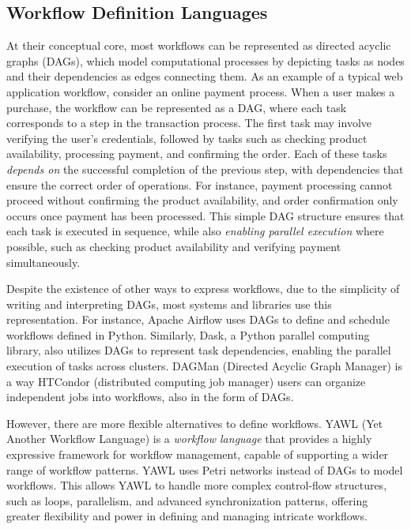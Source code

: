 \subsection{Workflow Definition Languages}
At their conceptual core, most workflows can be represented as directed acyclic graphs (DAGs), which model computational processes by depicting tasks as nodes and their dependencies as edges connecting them. As an example of a typical web application workflow, consider an online payment process. When a user makes a purchase, the workflow can be represented as a DAG, where each task corresponds to a step in the transaction process. The first task may involve verifying the user's credentials, followed by tasks such as checking product availability, processing payment, and confirming the order. Each of these tasks \textit{depends on} the successful completion of the previous step, with dependencies that ensure the correct order of operations. For instance, payment processing cannot proceed without confirming the product availability, and order confirmation only occurs once payment has been processed. This simple DAG structure ensures that each task is executed in sequence, while also \textit{enabling parallel execution} where possible, such as checking product availability and verifying payment simultaneously.

Despite the existence of other ways to express workflows, due to the simplicity of writing and interpreting DAGs, most systems and libraries use this representation. For instance, Apache Airflow\cite{apache_airflow} uses DAGs to define and schedule workflows defined in Python. Similarly, Dask\cite{dask_python}, a Python parallel computing library, also utilizes DAGs to represent task dependencies, enabling the parallel execution of tasks across clusters. DAGMan (Directed Acyclic Graph Manager)\cite{dagman} is a way HTCondor\cite{htcondor} (distributed computing job manager) users can organize independent jobs into workflows, also in the form of DAGs.

However, there are more flexible alternatives to define workflows. YAWL (Yet Another Workflow Language)\cite{yawl} is a \textit{workflow language} that provides a highly expressive framework for workflow management, capable of supporting a wider range of workflow patterns. YAWL uses Petri networks\cite{petri_nets} instead of DAGs to model workflows. This allows YAWL to handle more complex control-flow structures, such as loops, parallelism, and advanced synchronization patterns, offering greater flexibility and power in defining and managing intricate workflows.

